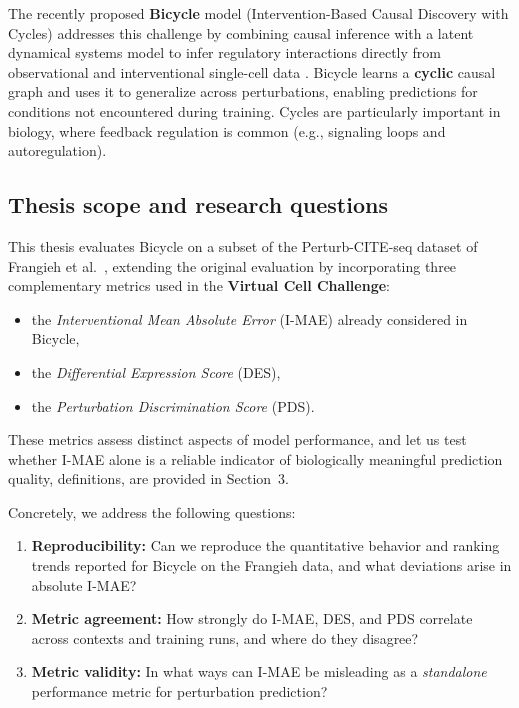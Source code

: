 \documentclass[12pt]{article}
\begin{document}
The recently proposed \textbf{Bicycle} model (Intervention-Based Causal Discovery with Cycles)
addresses this challenge by combining causal inference with a latent dynamical systems model to
infer regulatory interactions directly from observational and interventional single-cell data
\cite{rohbeck2024bicycle}. Bicycle learns a \textbf{cyclic} causal graph and uses it to generalize across
perturbations, enabling predictions for conditions not encountered during training. Cycles are
particularly important in biology, where feedback regulation is common (e.g., signaling loops and
autoregulation).

\subsection{Thesis scope and research questions}
This thesis evaluates Bicycle on a subset of the Perturb-CITE-seq dataset of
Frangieh et al.\ \cite{frangieh2021perturbcite}, extending the original evaluation by incorporating
three complementary metrics used in the \textbf{Virtual Cell Challenge}:
\begin{itemize}
    \item the \emph{Interventional Mean Absolute Error} (I-MAE) already considered in Bicycle,
    \item the \emph{Differential Expression Score} (DES),
    \item the \emph{Perturbation Discrimination Score} (PDS).
\end{itemize}
These metrics assess distinct aspects of model performance, and let us test whether I-MAE alone is
a reliable indicator of biologically meaningful prediction quality, definitions, are provided in Section~3.

Concretely, we address the following questions:
\begin{enumerate}
    \item \textbf{Reproducibility:} Can we reproduce the quantitative behavior and ranking trends
    reported for Bicycle on the Frangieh data, and what deviations arise in absolute I-MAE?
    \item \textbf{Metric agreement:} How strongly do I-MAE, DES, and PDS correlate across
    contexts and training runs, and where do they disagree?
    \item \textbf{Metric validity:} In what ways can I-MAE be misleading as a \emph{standalone}
    performance metric for perturbation prediction?
\end{enumerate}
\end{document}
